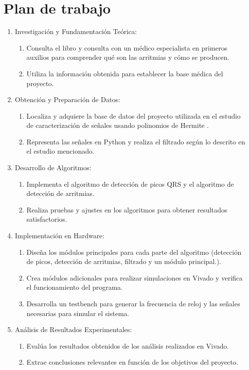 \section{Plan de trabajo}
\begin{enumerate}
	\item Investigación y Fundamentación Teórica:
	
	\begin{enumerate}
		\item Consulta el libro\cite{velez} y consulta con un médico especialista en primeros auxilios para comprender qué son las arritmias y cómo se producen.
	
		\item Utiliza la información obtenida para establecer la base médica del proyecto.
	\end{enumerate}

	\item Obtención y Preparación de Datos:
	\begin{enumerate}
		\item Localiza y adquiere la base de datos del proyecto utilizada en el estudio de caracterización de señales usando polinomios de Hermite \cite{desai2021low}.

		\item Representa las señales en Python y realiza el filtrado según lo descrito en el estudio mencionado.
	\end{enumerate}
	\item Desarrollo de Algoritmos:
	\begin{enumerate}
		\item Implementa el algoritmo de detección de picos QRS y el algoritmo de detección de arritmias.

		\item Realiza pruebas y ajustes en los algoritmos para obtener resultados satisfactorios.
	\end{enumerate}
	
	\item Implementación en Hardware: 
	\begin{enumerate}
		\item Diseña los módulos principales para cada parte del algoritmo (detección de picos, detección de arritmias, filtrado y un módulo principal.).

		\item Crea módulos adicionales para realizar simulaciones en Vivado y verifica el funcionamiento del programa.
		\item Desarrolla un testbench para generar la frecuencia de reloj y las señales necesarias para simular el sistema.
	\end{enumerate}

	\item Análisis de Resultados Experimentales:
	\begin{enumerate}
		\item Evalúa los resultados obtenidos de los análisis realizados en Vivado.

		\item Extrae conclusiones relevantes en función de los objetivos del proyecto.
	\end{enumerate}
\end{enumerate}

